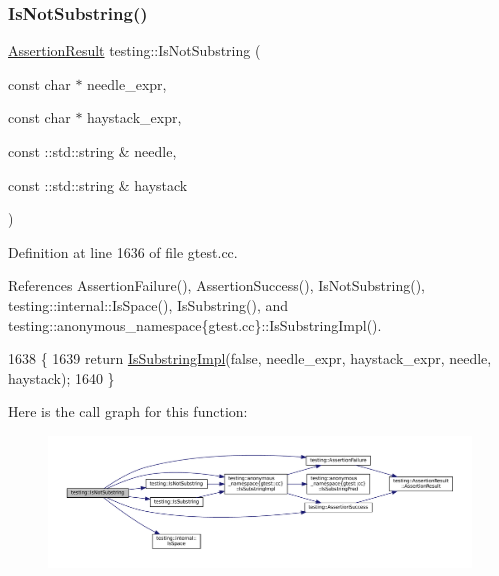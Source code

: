\subsubsection{\texorpdfstring{Is\+Not\+Substring()}{IsNotSubstring()}\hspace{0.1cm}{\footnotesize\ttfamily [3/3]}}
{\footnotesize\ttfamily \hyperlink{classtesting_1_1AssertionResult}{Assertion\+Result} testing\+::\+Is\+Not\+Substring (\begin{DoxyParamCaption}\item[{const char $\ast$}]{needle\+\_\+expr,  }\item[{const char $\ast$}]{haystack\+\_\+expr,  }\item[{const \+::std\+::string \&}]{needle,  }\item[{const \+::std\+::string \&}]{haystack }\end{DoxyParamCaption})}



Definition at line 1636 of file gtest.\+cc.



References Assertion\+Failure(), Assertion\+Success(), Is\+Not\+Substring(), testing\+::internal\+::\+Is\+Space(), Is\+Substring(), and testing\+::anonymous\+\_\+namespace\{gtest.\+cc\}\+::\+Is\+Substring\+Impl().


\begin{DoxyCode}
1638                                                         \{
1639   \textcolor{keywordflow}{return} \hyperlink{namespacetesting_1_1anonymous__namespace_02gtest_8cc_03_a0e1cb1e2b03a87a9c893322e4caab670}{IsSubstringImpl}(\textcolor{keyword}{false}, needle\_expr, haystack\_expr, needle, haystack);
1640 \}
\end{DoxyCode}
Here is the call graph for this function\+:
\nopagebreak
\begin{figure}[H]
\begin{center}
\leavevmode
\includegraphics[width=350pt]{namespacetesting_abe7b3fa1c9528745f934d4a14155ea87_cgraph}
\end{center}
\end{figure}
\mbox{\label{namespacetesting_a56ffb1a169c14ce585fc5bed32add2db}} 
